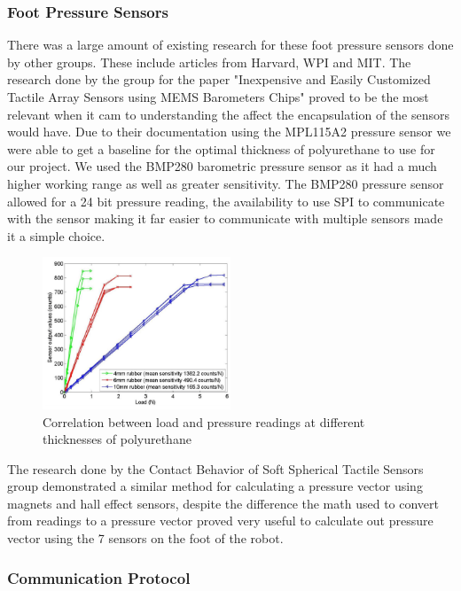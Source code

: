 \subsubsection{Foot Pressure Sensors}
There was a large amount of existing research for these foot pressure sensors done by other groups. These include articles from Harvard\cite{chuah2012composite}\cite{chuah2014enabling}, WPI\cite{youssefian2014contact} and MIT\cite{tenzer2014inexpensive}. The research done by the group for the paper "Inexpensive and Easily Customized Tactile Array Sensors using MEMS Barometers Chips" \cite{chuah2012composite} proved to be the most relevant when it cam to understanding the affect the encapsulation of the sensors would have. Due to their documentation using the MPL115A2 pressure sensor we were able to get a baseline for the optimal thickness of polyurethane to use for our project. We used the BMP280 barometric pressure sensor \cite{BMP280} as it had a much higher working range as well as greater sensitivity. The BMP280 pressure sensor allowed for a 24 bit pressure reading, the availability to use SPI to communicate with the sensor making it far easier to communicate with multiple sensors made it a simple choice.
\begin{figure}[H]
    \centering
    \includegraphics[width=0.5\textwidth]{figures/Load_vs_SensorvsThickness.png}
    \caption{Correlation between load and pressure readings at different thicknesses of polyurethane\cite{chuah2012composite}}
    \label{fig:ThicknessVSPressure}
\end{figure}

The research done by the Contact Behavior of Soft Spherical Tactile Sensors\cite{youssefian2014contact} group demonstrated a similar method for calculating a pressure vector using magnets and hall effect sensors, despite the difference the math used to convert from readings to a pressure vector proved very useful to calculate out pressure vector using the 7 sensors on the foot of the robot. 
\subsubsection{Communication Protocol}
